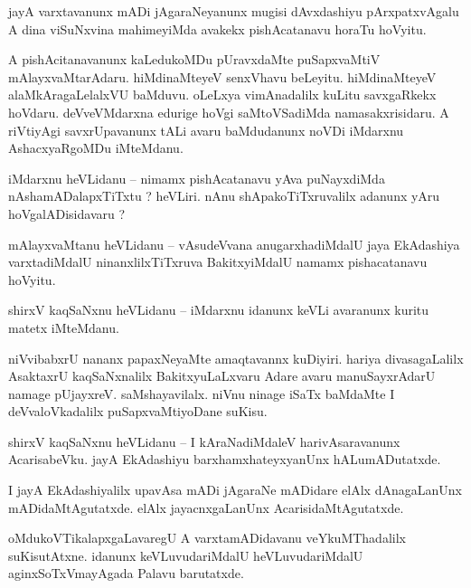 \documentclass{article}
\begin{document}
\begin{mn}%
jayA varxtavanunx mADi jAgaraNeyanunx mugisi dAvxdashiyu pArxpatxvAgalu A dina viSuNxvina 
mahimeyiMda avakekx pishAcatanavu horaTu hoVyitu.
\end{mn}

\begin{mn}%
A pishAcitanavanunx kaLedukoMDu pUravxdaMte puSapxvaMtiV mAlayxvaMtarAdaru. hiMdinaMteyeV senxVhavu 
beLeyitu. hiMdinaMteyeV alaMkAragaLelalxVU baMduvu. oLeLxya vimAnadalilx kuLitu savxgaRkekx 
hoVdaru. deVveVMdarxna edurige hoVgi saMtoVSadiMda namasakxrisidaru. A riVtiyAgi savxrUpavanunx 
tALi avaru baMdudanunx noVDi iMdarxnu AshacxyaRgoMDu iMteMdanu. 
\end{mn}

\begin{mn}%
iMdarxnu heVLidanu -- nimamx pishAcatanavu yAva puNayxdiMda nAshamADalapxTiTxtu ? heVLiri. nAnu 
shApakoTiTxruvalilx adanunx yAru hoVgalADisidavaru ?
\end{mn}

\begin{mn}%
mAlayxvaMtanu heVLidanu -- vAsudeVvana anugarxhadiMdalU jaya EkAdashiya varxtadiMdalU 
ninanxlilxTiTxruva BakitxyiMdalU namamx pishacatanavu hoVyitu.
\end{mn}

\begin{mn}%
shirxV kaqSaNxnu heVLidanu -- iMdarxnu idanunx keVLi avaranunx kuritu matetx iMteMdanu.
\end{mn}

\begin{mn}%
niVvibabxrU nananx papaxNeyaMte amaqtavannx kuDiyiri. hariya divasagaLalilx AsaktaxrU kaqSaNxnalilx 
BakitxyuLaLxvaru Adare avaru manuSayxrAdarU namage pUjayxreV. saMshayavilalx. niVnu ninage iSaTx 
baMdaMte I deVvaloVkadalilx puSapxvaMtiyoDane suKisu.
\end{mn}

\begin{mn}%
shirxV kaqSaNxnu heVLidanu -- I kAraNadiMdaleV harivAsaravanunx AcarisabeVku. jayA EkAdashiyu 
barxhamxhateyxyanUnx hALumADutatxde.
\end{mn}

\begin{mn}%
I jayA EkAdashiyalilx upavAsa mADi jAgaraNe mADidare elAlx dAnagaLanUnx mADidaMtAgutatxde. elAlx 
jayacnxgaLanUnx AcarisidaMtAgutatxde.
\end{mn}

\begin{mn}%
oMdukoVTikalapxgaLavaregU A varxtamADidavanu veYkuMThadalilx suKisutAtxne. idanunx keVLuvudariMdalU 
heVLuvudariMdalU aginxSoTxVmayAgada Palavu barutatxde.
\end{mn}
\end{document}
